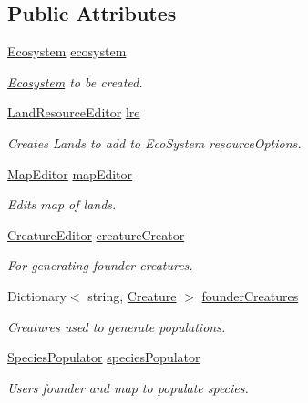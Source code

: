 \subsection*{Public Attributes}
\begin{DoxyCompactItemize}
\item 
\mbox{\hyperlink{class_ecosystem}{Ecosystem}} \mbox{\hyperlink{class_ecosystem_editor_a49e0702cf9757efdf05a098336737890}{ecosystem}}
\begin{DoxyCompactList}\small\item\em \mbox{\hyperlink{class_ecosystem}{Ecosystem}} to be created. \end{DoxyCompactList}\item 
\mbox{\hyperlink{class_land_resource_editor}{Land\+Resource\+Editor}} \mbox{\hyperlink{class_ecosystem_editor_a1879450c7d71911c3a0f5b12cc287b2b}{lre}}
\begin{DoxyCompactList}\small\item\em Creates Lands to add to Eco\+System resource\+Options. \end{DoxyCompactList}\item 
\mbox{\hyperlink{class_map_editor}{Map\+Editor}} \mbox{\hyperlink{class_ecosystem_editor_ae2dd3be1675ac49fe39d706cef093386}{map\+Editor}}
\begin{DoxyCompactList}\small\item\em Edits map of lands. \end{DoxyCompactList}\item 
\mbox{\hyperlink{class_creature_editor}{Creature\+Editor}} \mbox{\hyperlink{class_ecosystem_editor_ae07c75810b8d9ff769bf1cd552786138}{creature\+Creator}}
\begin{DoxyCompactList}\small\item\em For generating founder creatures. \end{DoxyCompactList}\item 
Dictionary$<$ string, \mbox{\hyperlink{class_creature}{Creature}} $>$ \mbox{\hyperlink{class_ecosystem_editor_a3b9c67b19a314455f9eaf3eaa0cbe341}{founder\+Creatures}}
\begin{DoxyCompactList}\small\item\em Creatures used to generate populations. \end{DoxyCompactList}\item 
\mbox{\hyperlink{class_species_populator}{Species\+Populator}} \mbox{\hyperlink{class_ecosystem_editor_abe484ddd93b48d1300e88ab531d56aec}{species\+Populator}}
\begin{DoxyCompactList}\small\item\em Users founder and map to populate species. \end{DoxyCompactList}\item 

\end{DoxyCompactItemize}
